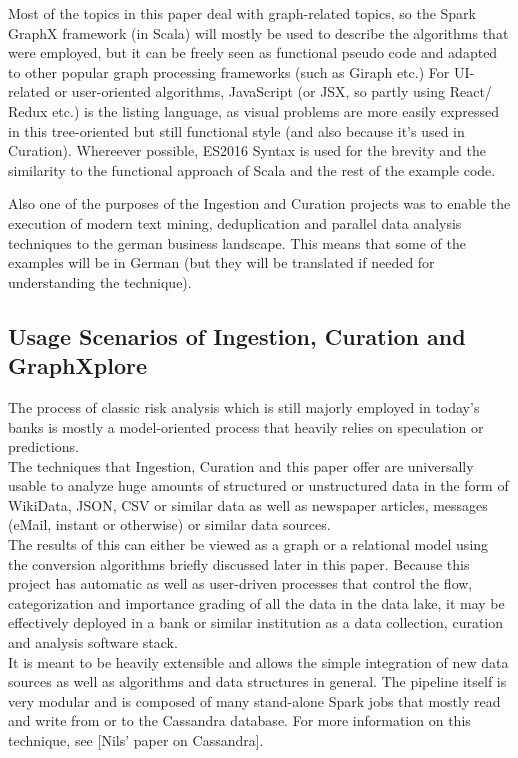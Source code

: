 \documentclass[
        a4paper,     %
        titlepage,   %
        oneside,     %
        parskip      %
        ]{scrartcl}  %
\begin{document}
    Most of the topics in this paper deal with graph-related topics, so the Spark GraphX framework
    (in Scala) will mostly be used to describe the algorithms that were employed,
    but it can be freely seen as functional pseudo code and adapted to other popular
    graph processing frameworks (such as Giraph etc.) %
    For UI-related or user-oriented algorithms, JavaScript (or JSX, so partly using React/ Redux etc.)
    is the listing language, as visual problems are more easily expressed in this
    tree-oriented but still functional style (and also because it's used in Curation). %
    Whereever possible, ES2016 Syntax is used for the brevity and the similarity
    to the functional approach of Scala and the rest of the example code.

    Also one of the purposes of the Ingestion and Curation projects was to enable
    the execution of modern text mining, deduplication and parallel data analysis techniques
    to the german business landscape. This means that some of the examples will be
    in German (but they will be translated if needed for understanding the technique).

    \subsection{Usage Scenarios of Ingestion, Curation and GraphXplore}
    The process of classic risk analysis which is still majorly employed in today's banks is mostly
    a model-oriented process that heavily relies on speculation or predictions.\\
    The techniques that Ingestion, Curation and this paper offer are universally
    usable to analyze huge amounts of structured or unstructured data
    in the form of WikiData, JSON, CSV or similar data as well as newspaper articles,
    messages (eMail, instant or otherwise) or similar data sources.\\
    The results of this can either be viewed as a graph or a relational model
    using the conversion algorithms briefly discussed later in this paper. %
    Because this project has automatic as well as user-driven processes
    that control the flow, categorization and importance grading %
    of all the data in the data lake, it may be effectively deployed in a bank
    or similar institution as a data collection, curation and analysis software stack.\\
    It is meant to be heavily extensible and allows the simple integration of new data sources %
    as well as algorithms and data structures in general. The pipeline itself is very modular
    and is composed of many stand-alone Spark jobs that mostly read and write from or to the Cassandra database.
    For more information on this technique, see [Nils' paper on Cassandra]. %
\end{document}
